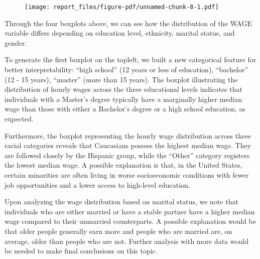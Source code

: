 \documentclass[
  letterpaper,
  DIV=11,
  numbers=noendperiod]{scrartcl}
\newenvironment{Shaded}{\begin{snugshade}}{\end{snugshade}}
\newcommand{\AttributeTok}[1]{\textcolor[rgb]{0.40,0.45,0.13}{#1}}
\newcommand{\DecValTok}[1]{\textcolor[rgb]{0.68,0.00,0.00}{#1}}
\newcommand{\FunctionTok}[1]{\textcolor[rgb]{0.28,0.35,0.67}{#1}}
\newcommand{\NormalTok}[1]{\textcolor[rgb]{0.00,0.23,0.31}{#1}}
\newcommand{\SpecialCharTok}[1]{\textcolor[rgb]{0.37,0.37,0.37}{#1}}
\newcommand{\StringTok}[1]{\textcolor[rgb]{0.13,0.47,0.30}{#1}}
\begin{document}
\begin{Shaded}
\end{Shaded}

\begin{figure}[H]

{\centering \texttt{[image: report\_files/figure-pdf/unnamed-chunk-8-1.pdf]}

}

\end{figure}

Through the four boxplots above, we can see how the distribution of the
WAGE variable differs depending on education level, ethnicity, marital
status, and gender.

To generate the first boxplot on the topleft, we built a new categorical
feature for better interpretability: ``high school'' (12 years or less
of education), ``bachelor'' (12 - 15 years), ``master'' (more than 15
years). The boxplot illustrating the distribution of hourly wages across
the three educational levels indicates that individuals with a Master's
degree typically have a marginally higher median wage than those with
either a Bachelor's degree or a high school education, as expected.

Furthermore, the boxplot representing the hourly wage distribution
across three racial categories reveals that Caucasians possess the
highest median wage. They are followed closely by the Hispanic group,
while the ``Other'' category registers the lowest median wage. A
possible explanation is that, in the United States, certain minorities
are often living in worse socioeconomic conditions with fewer job
opportunities and a lower access to high-level education.

Upon analyzing the wage distribution based on marital status, we note
that individuals who are either married or have a stable partner have a
higher median wage compared to their unmarried counterparts. A possible
explanation would be that older people generally earn more and people
who are married are, on average, older than people who are not. Further
analysis with more data would be needed to make final conclusions on
this topic.
\end{document}
